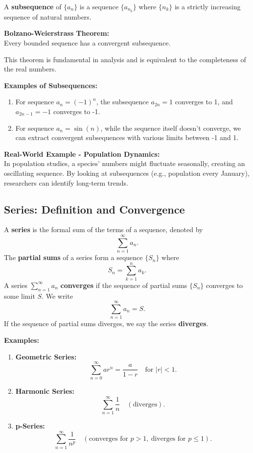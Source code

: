 \documentclass{article}
\begin{document}
A \textbf{subsequence} of $\{a_n\}$ is a sequence $\{a_{n_k}\}$ where $\{n_k\}$ is a strictly increasing sequence of natural numbers.

\textbf{Bolzano-Weierstrass Theorem:} \\
Every bounded sequence has a convergent subsequence.

This theorem is fundamental in analysis and is equivalent to the completeness of the real numbers.

\textbf{Examples of Subsequences:}
\begin{enumerate}[label=\textbf{\arabic*.}]
    \item For sequence $a_n = (-1)^n$, the subsequence $a_{2n} = 1$ converges to 1, and $a_{2n-1} = -1$ converges to -1.
    \item For sequence $a_n = \sin(n)$, while the sequence itself doesn't converge, we can extract convergent subsequences with various limits between -1 and 1.
\end{enumerate}

\textbf{Real-World Example - Population Dynamics:} \\
In population studies, a species' numbers might fluctuate seasonally, creating an oscillating sequence. By looking at subsequences (e.g., population every January), researchers can identify long-term trends.

\subsection{Series: Definition and Convergence} \label{series-definition}

A \textbf{series} is the formal sum of the terms of a sequence, denoted by
\[
\sum_{n=1}^{\infty} a_n.
\]
The \textbf{partial sums} of a series form a sequence $\{S_n\}$ where 
\[
S_n = \sum_{k=1}^{n} a_k.
\]
A series $\sum_{n=1}^{\infty} a_n$ \textbf{converges} if the sequence of partial sums $\{S_n\}$ converges to some limit $S$. We write
\[
\sum_{n=1}^{\infty} a_n = S.
\]
If the sequence of partial sums diverges, we say the series \textbf{diverges}.

\textbf{Examples:}
\begin{enumerate}[label=\textbf{\arabic*.}]
    \item \textbf{Geometric Series:} 
    \[
    \sum_{n=0}^{\infty} ar^n = \frac{a}{1-r} \quad \text{for } |r| < 1.
    \]
    \item \textbf{Harmonic Series:} 
    \[
    \sum_{n=1}^{\infty} \frac{1}{n} \quad (\text{diverges}).
    \]
    \item \textbf{p-Series:} 
    \[
    \sum_{n=1}^{\infty} \frac{1}{n^p} \quad (\text{converges for } p > 1,\ \text{diverges for } p \leq 1).
    \]
\end{enumerate}
\end{document}

